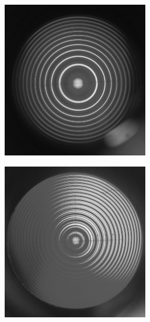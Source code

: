 \begin{figure}[h]
  \centering
  \begin{subfigure}[h]{0.5\textwidth}
    \centering
    \includegraphics[width=0.7\textwidth]{data/bilder_okular/bild_1_edit.jpg}
    \label{fig:bildtransohneB}
  \end{subfigure}%
  \begin{subfigure}[h]{0.5\textwidth}
    \centering
    \includegraphics[width=0.7\textwidth]{data/bilder_okular/bild_2_edit.jpg}
    \label{fig:bildtransmitB}
  \end{subfigure}
  \caption{}
\end{figure}

